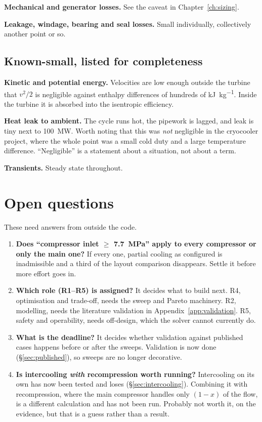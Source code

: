 \documentclass[11pt,a4paper]{report}
\begin{document}
\textbf{Mechanical and generator losses.} See the caveat in
Chapter~\ref{ch:sizing}.

\textbf{Leakage, windage, bearing and seal losses.} Small individually,
collectively another point or so.

\section{Known-small, listed for completeness}

\textbf{Kinetic and potential energy.} Velocities are low enough outside the
turbine that $v^2/2$ is negligible against enthalpy differences of hundreds
of \si{\kilo\joule\per\kilogram}. Inside the turbine it is absorbed into the
isentropic efficiency.

\textbf{Heat leak to ambient.} The cycle runs hot, the pipework is lagged,
and leak is tiny next to \SI{100}{\mega\watt}. Worth noting that this was
\emph{not} negligible in the cryocooler project, where the whole point was a
small cold duty and a large temperature difference. ``Negligible'' is a
statement about a situation, not about a term.

\textbf{Transients.} Steady state throughout.

\chapter{Open questions}
\label{ch:open}

These need answers from outside the code.

\begin{enumerate}\itemsep4pt
\item \textbf{Does ``compressor inlet $\ge$ \SI{7.7}{\mega\pascal}'' apply
to every compressor or only the main one?} If every one, partial cooling as
configured is inadmissible and a third of the layout comparison disappears.
Settle it before more effort goes in.

\item \textbf{Which role (R1--R5) is assigned?} It decides what to build
next. R4, optimisation and trade-off, needs the sweep and Pareto machinery.
R2, modelling, needs the literature validation in
Appendix~\ref{app:validation}. R5, safety and operability, needs off-design,
which the solver cannot currently do.

\item \textbf{What is the deadline?} It decides whether validation against
published cases happens before or after the sweeps. Validation is now
done (\S\ref{sec:published}), so sweeps are no longer decorative.

\item \textbf{Is intercooling \emph{with} recompression worth running?}
Intercooling on its own has now been tested and loses
(\S\ref{sec:intercooling}). Combining it with recompression, where the main
compressor handles only $(1-x)$ of the flow, is a different calculation and
has not been run. Probably not worth it, on the evidence, but that is a
guess rather than a result.
\end{enumerate}
\end{document}
